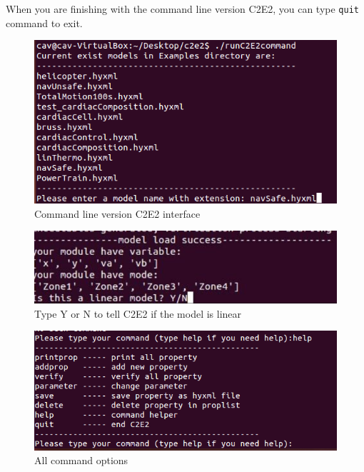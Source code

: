\documentclass{tufte-book} %
\begin{document}
When you are finishing with the command line version C2E2, you can type \texttt{quit} command to exit.

\begin{figure}
 \centerline{\includegraphics[scale=.25,keepaspectratio=true]{Manual_ver0_2_image/terminal_main.png}}
 \caption{Command line version C2E2 interface} 
  \label{figure:terminalmain}
\end{figure}

\begin{figure}
 \centerline{\includegraphics[scale=.25,keepaspectratio=true]{Manual_ver0_2_image/terminal_linear.png}}
 \caption{Type Y or N to tell C2E2 if the model is linear} 
  \label{figure:terminallinear}
\end{figure}

\begin{figure}
 \centerline{\includegraphics[scale=.25,keepaspectratio=true]{Manual_ver0_2_image/terminal_help.png}}
 \caption{All command options} 
  \label{figure:terminalhelp}
\end{figure}
\end{document}
